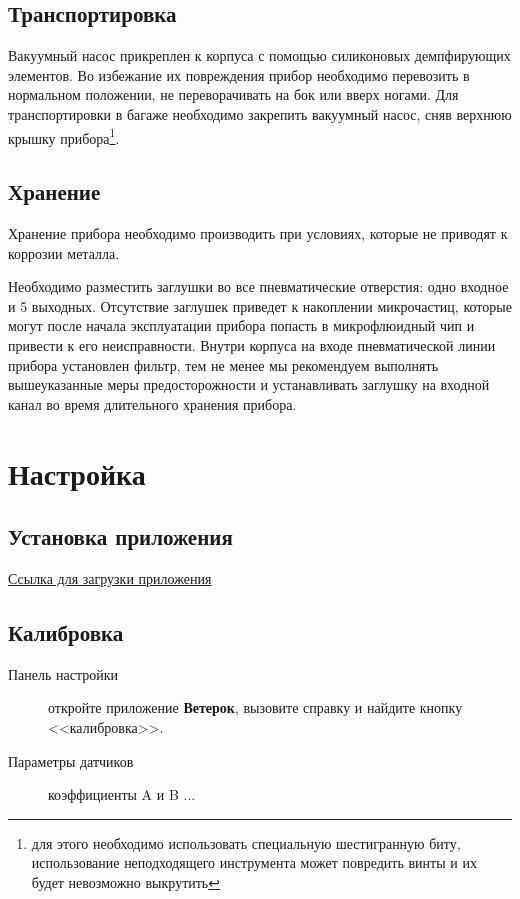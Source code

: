 \documentclass[twoside, 12pt, a4paper]{refart}
\begin{document}
\subsection{Транспортировка}

Вакуумный насос прикреплен к корпуса с помощью силиконовых демпфирующих элементов. Во избежание их повреждения прибор необходимо перевозить в нормальном положении, не переворачивать на бок или вверх ногами. Для транспортировки в багаже необходимо закрепить вакуумный насос, сняв верхнюю крышку прибора\footnote{для этого необходимо использовать специальную шестигранную биту, использование неподходящего инструмента может повредить винты и их будет невозможно выкрутить}.

\subsection{Хранение}

Хранение прибора необходимо производить при условиях, которые не приводят к коррозии металла.

Необходимо разместить заглушки во все пневматические отверстия: одно входное и 5 выходных. Отсутствие заглушек приведет к накоплении микрочастиц, которые могут после начала эксплуатации прибора попасть в микрофлюидный чип и привести к его неисправности. Внутри корпуса на входе пневматической линии прибора установлен фильтр, тем не менее мы рекомендуем выполнять вышеуказанные меры предосторожности и устанавливать заглушку на входной канал во время длительного хранения прибора.


\newpage
\section{Настройка}
\label{setup}

\subsection{Установка приложения}

\href{https://yadi.sk/d/PSVfIjKNqCgW_g}{Ссылка для загрузки приложения}



\subsection{Калибровка}
 


\begin{description}

\item[Панель настройки]
        откройте приложение \textbf{Ветерок}, вызовите справку и найдите кнопку <<калибровка>>.
        
\item[Параметры датчиков]
        коэффициенты A и B ... 
        

\end{description}
\end{document}
